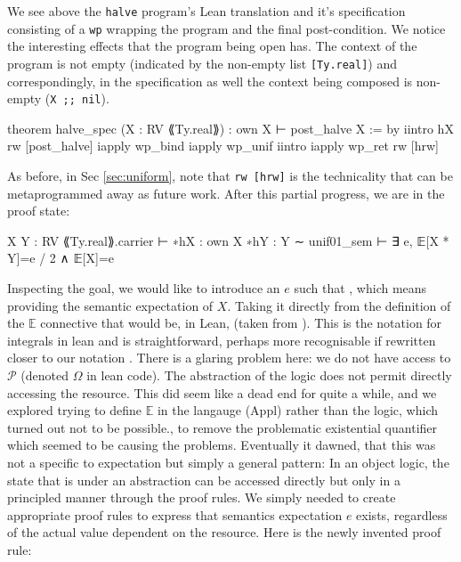 
We see above the \texttt{halve} program's Lean translation and it's specification consisting of a \texttt{wp} wrapping the
program and the final post-condition. We notice the interesting effects that the program being open has. The context of the program
is not empty (indicated by the non-empty list \texttt{[Ty.real]}) and correspondingly, in the specification as well the context
being composed is non-empty (\texttt{X ;; nil}).

\begin{leancode}
theorem halve_spec (X : RV ⟪Ty.real⟫) : own X ⊢ post_halve X := by
  iintro hX
  rw [post_halve]
  iapply wp_bind
  iapply wp_unif
  iintro %
  iapply wp_ret
  rw [hrw]
\end{leancode}

As before, in Sec \ref{sec:uniform}, note that \texttt{rw [hrw]} is the technicality that can be metaprogrammed away as future work.
After this partial progress, we are in the proof state:

\begin{leancode}
X Y : RV ⟪Ty.real⟫.carrier
⊢ 
∗hX : own X
∗hY : Y ∼ unif01_sem
⊢ ∃ e, 𝔼[X * Y]=e / 2 ∧ 𝔼[X]=e
\end{leancode}

Inspecting the goal, we would like to introduce an $e$ such that , which means providing the semantic expectation of $X$.
Taking it directly from the definition of the $\mathbb{E}$ connective that would be, in Lean,  (taken from ).
This is the notation for integrals in lean and is straightforward, perhaps more recognisable if rewritten closer to our notation .
There is a glaring problem here: we do not have access to $\mathcal{P}$ (denoted $\Omega$ in lean code). The abstraction of the logic
does not permit directly accessing the resource. This did seem like a dead end for quite a while, and we explored trying to define $\mathbb{E}$ in the
langauge (Appl) rather than the logic, which turned out not to be possible., to remove the problematic existential quantifier
which seemed to be causing the problems. Eventually it dawned, that this was not a specific to expectation but simply a general pattern: In an object logic,
the state that is under an abstraction can be accessed directly but only in a principled manner through the proof rules. We simply needed to create appropriate proof rules
to express that semantics expectation $e$ exists, regardless of the actual value dependent on the resource. Here is the newly invented proof rule:

